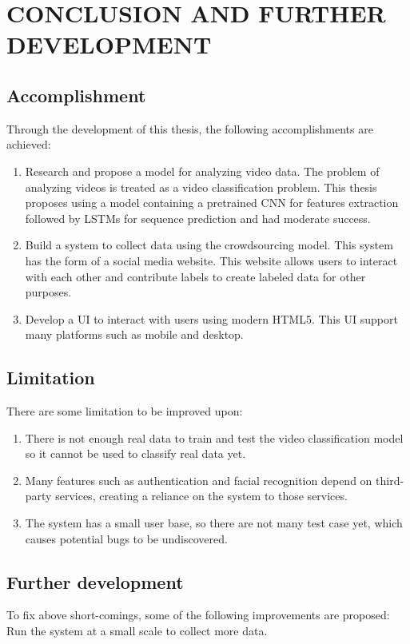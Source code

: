 \chapter{CONCLUSION AND FURTHER DEVELOPMENT}

\section{Accomplishment}
Through the development of this thesis, the following accomplishments are achieved:
\begin{enumerate}
    \item Research and propose a model for analyzing video data. The problem of analyzing videos is treated as a video classification problem. This thesis proposes using a model containing a pretrained CNN for features extraction followed by LSTMs for sequence prediction and had moderate success.
    \item Build a system to collect data using the crowdsourcing model. This system has the form of a social media website. This website allows users to interact with each other and contribute labels to create labeled data for other purposes.
    \item Develop a UI to interact with users using modern HTML5. This UI support many platforms such as mobile and desktop.
\end{enumerate}


\section{Limitation}
There are some limitation to be improved upon:

\begin{enumerate}

\item There is not enough real data to train and test the video classification model so it cannot be used to classify real data yet.
\item Many features such as authentication and facial recognition depend on third-party services, creating a reliance on the system to those services.
\item The system has a small user base, so there are not many test case yet, which causes potential bugs to be undiscovered.
\end{enumerate}

\section{Further development}
To fix above short-comings, some of the following improvements are proposed:
Run the system at a small scale to collect more data.


